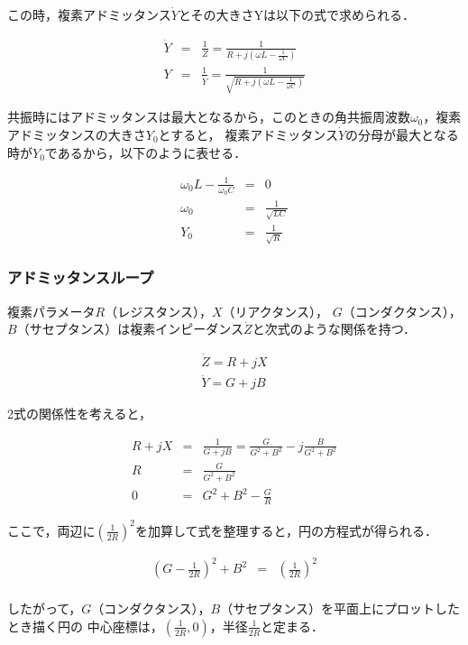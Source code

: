 \documentclass[dvipdfmx,titlepage,a4j]{jsarticle}  %
\numberwithin{equation}{section}
\begin{document}
この時，複素アドミッタンス$\dot{Y}$とその大きさYは以下の式で求められる．

\begin{eqnarray}
  \dot{Y} &=& \frac{1}{Z} = \frac{1}{R + j(\omega L - \frac{1}{\omega C})} \\
  Y &=& \frac{1}{\dot{Y}} = \frac{1}{\sqrt{R + j(\omega L - \frac{1}{\omega C})}}
\end{eqnarray}

共振時にはアドミッタンスは最大となるから，このときの角共振周波数$\omega_0$，複素アドミッタンスの大きさ$Y_0$とすると，
複素アドミッタンス$\dot{Y}$の分母が最大となる時が$Y_0$であるから，以下のように表せる．

\begin{eqnarray}
  \omega_0 L - \frac{1}{\omega_0 C} &=& 0 \\
  \omega_0 &=& \frac{1}{\sqrt{LC}} \\
  Y_0 &=& \frac{1}{\sqrt{R}}
\end{eqnarray}

\subsubsection{アドミッタンスループ}

複素パラメータ$R$（レジスタンス），$X$（リアクタンス），
$G$（コンダクタンス），$B$（サセプタンス）は複素インピーダンス$\dot{Z}$と次式のような関係を持つ．

\begin{eqnarray}
  \dot{Z} = R + jX \\
  \dot{Y} = G + jB
\end{eqnarray}

2式の関係性を考えると，

\begin{eqnarray}
  R + jX &=& \frac{1}{G + jB} = \frac{G}{G^2 + B^2} -j\frac{B}{G^2 + B^2} \\
  R &=& \frac{G}{G^2 + B^2} \\
  0 &=& G^2 + B^2 - \frac{G}{R}
\end{eqnarray}

ここで，両辺に$(\frac{1}{2R})^2$を加算して式を整理すると，円の方程式が得られる．

\begin{eqnarray}
  (G - \frac{1}{2R})^2 + B^2 &=& (\frac{1}{2R})^2 \\
\end{eqnarray}

したがって，$G$（コンダクタンス），$B$（サセプタンス）を平面上にプロットしたとき描く円の
中心座標は，$(\frac{1}{2R}, 0)$，半径$\frac{1}{2R}$と定まる．
\end{document}
